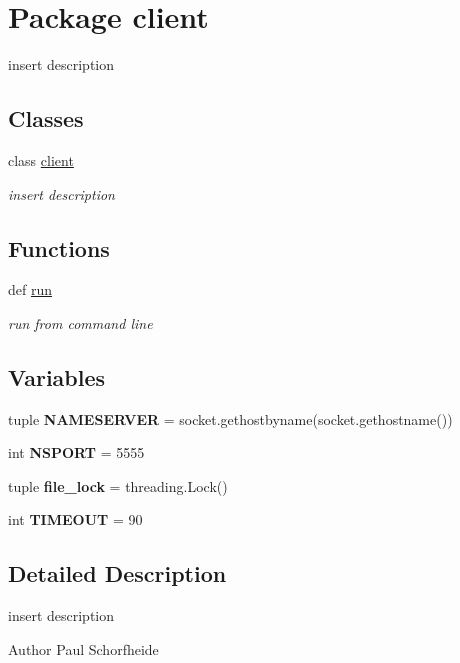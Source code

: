 \hypertarget{namespaceclient}{
\section{Package client}
\label{namespaceclient}
}


insert description  


\subsection*{Classes}
\begin{DoxyCompactItemize}
\item 
class \hyperlink{classclient_1_1client}{client}
\begin{DoxyCompactList}\small\item\em insert description \item\end{DoxyCompactList}\end{DoxyCompactItemize}
\subsection*{Functions}
\begin{DoxyCompactItemize}
\item 
\hypertarget{namespaceclient_a601ceb19ee5f1ccf80e2d6f920796bf2}{
def \hyperlink{namespaceclient_a601ceb19ee5f1ccf80e2d6f920796bf2}{run}}
\label{namespaceclient_a601ceb19ee5f1ccf80e2d6f920796bf2}

\begin{DoxyCompactList}\small\item\em run from command line \item\end{DoxyCompactList}\end{DoxyCompactItemize}
\subsection*{Variables}
\begin{DoxyCompactItemize}
\item 
\hypertarget{namespaceclient_aca47b321232ec73d204207ea8937cb6a}{
tuple {\bfseries NAMESERVER} = socket.gethostbyname(socket.gethostname())}
\label{namespaceclient_aca47b321232ec73d204207ea8937cb6a}

\item 
\hypertarget{namespaceclient_a15f7d084361f80b7f3cfe4dfea8ec522}{
int {\bfseries NSPORT} = 5555}
\label{namespaceclient_a15f7d084361f80b7f3cfe4dfea8ec522}

\item 
\hypertarget{namespaceclient_afa2ee33dc034920f8aab99108c3b7743}{
tuple {\bfseries file\_\-lock} = threading.Lock()}
\label{namespaceclient_afa2ee33dc034920f8aab99108c3b7743}

\item 
\hypertarget{namespaceclient_a1e07168544409bc8bf0b656eebc8e888}{
int {\bfseries TIMEOUT} = 90}
\label{namespaceclient_a1e07168544409bc8bf0b656eebc8e888}

\end{DoxyCompactItemize}


\subsection{Detailed Description}
insert description \begin{DoxyAuthor}{Author}
Paul Schorfheide 
\end{DoxyAuthor}
